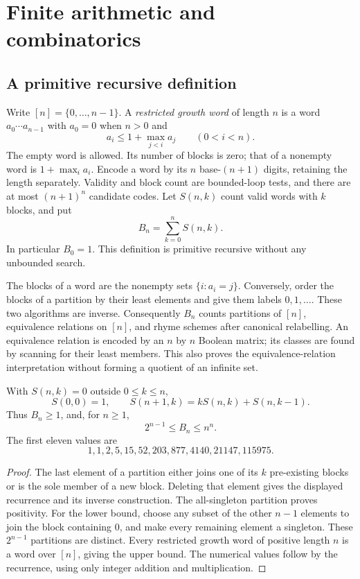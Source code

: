 \section{Finite arithmetic and combinatorics}
\label{sec:finite}

\subsection{A primitive recursive definition}

Write $[n]=\{0,\ldots,n-1\}$. A \emph{restricted growth word} of length $n$ is a word
$a_0\cdots a_{n-1}$ with $a_0=0$ when $n>0$ and
\[
  a_i\leq 1+\max_{j<i}a_j\qquad(0<i<n).
\]
The empty word is allowed. Its number of blocks is zero; that of a nonempty
word is $1+\max_i a_i$. Encode a word by its $n$ base-$(n+1)$ digits, retaining
the length separately. Validity and block count are bounded-loop tests, and
there are at most $(n+1)^n$ candidate codes. Let $S(n,k)$ count valid words
with $k$ blocks, and put
\begin{equation}\label{eq:bell-stirling}
  B_n=\sum_{k=0}^{n}S(n,k).
\end{equation}
In particular $B_0=1$. This definition is primitive recursive without any
unbounded search.

The blocks of a word are the nonempty sets $\{i:a_i=j\}$. Conversely, order the
blocks of a partition by their least elements and give them labels
$0,1,\ldots$. These two algorithms are inverse. Consequently $B_n$ counts
partitions of $[n]$, equivalence relations on $[n]$, and rhyme schemes after
canonical relabelling. An equivalence relation is encoded by an $n$ by $n$
Boolean matrix; its classes are found by scanning for their least members.
This also proves the equivalence-relation interpretation without forming a
quotient of an infinite set.

\begin{proposition}\label{prop:stirling}
With $S(n,k)=0$ outside $0\leq k\leq n$,
\[
 S(0,0)=1,\qquad S(n+1,k)=kS(n,k)+S(n,k-1).
\]
Thus $B_n\geq1$, and, for $n\geq1$,
\[
 2^{n-1}\leq B_n\leq n^n.
\]
The first eleven values are
\[
 1,1,2,5,15,52,203,877,4140,21147,115975.
\]
\end{proposition}
\begin{proof}
The last element of a partition either joins one of its $k$ pre-existing
blocks or is the sole member of a new block. Deleting that element gives the
displayed recurrence and its inverse construction. The all-singleton
partition proves positivity. For the lower bound, choose any subset of the
other $n-1$ elements to join the block containing $0$, and make every remaining
element a singleton. These $2^{n-1}$ partitions are distinct. Every restricted
growth word of positive length $n$ is a word over $[n]$, giving the upper bound.
The numerical values follow by the recurrence, using only integer addition
and multiplication.
\end{proof}


